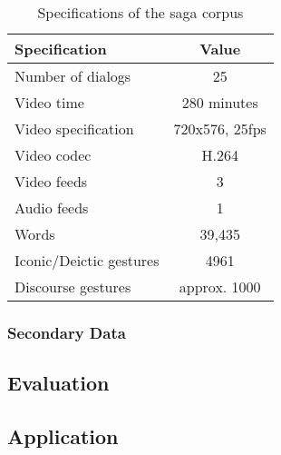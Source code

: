 \documentclass[a4paper]{article}
\begin{document}
				\begin{table}
					\center
					\begin{tabular}{|l|c|}
					\hline 
					\textbf{Specification} & \textbf{Value} \\ 
					\hline 
					Number of dialogs & 25 \\ 
					\hline 
					Video time & 280 minutes \\ 
					\hline 
					Video specification & 720x576, 25fps  \\ 
					\hline 
					Video codec & H.264  \\ 
					\hline 
					Video feeds & 3 \\ 
					\hline 
					Audio feeds & 1 \\ 
					\hline 
					Words & 39,435 \\ 
					\hline 
					Iconic/Deictic gestures & 4961 \\ 
					\hline 
					Discourse gestures & approx. 1000 \\ 
					\hline 
					\end{tabular} 
					\caption{Specifications of the \gls{saga} corpus}
					\label{table:sagaIndicators}
				\end{table}
				
			\subsubsection{Secondary Data}
				
		
		\subsection{Evaluation}
		
		\subsection{Application}
		

  	\newpage
  	\eightpt
  	

  	
\end{document}
